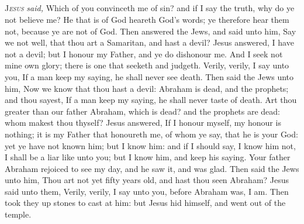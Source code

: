 \subsection{}
\lettrine{J}{\emph{esus}} \emph{said,} Which of you convinceth me of sin? and if I say the truth, why do ye not believe me? He that is of God heareth God's words; ye therefore hear them not, because ye are not of God. Then answered the Jews, and said unto him, Say we not well, that thou art a Samaritan, and hast a devil? Jesus answered, I have not a devil; but I honour my Father, and ye do dishonour me. And I seek not mine own glory; there is one that seeketh and judgeth. Verily, verily, I say unto you, If a man keep my saying, he shall never see death. Then said the Jews unto him, Now we know that thou hast a devil: Abraham is dead, and the prophets; and thou sayest, If a man keep my saying, he shall never taste of death. Art thou greater than our father Abraham, which is dead? and the prophets are dead: whom makest thou thyself? Jesus answered, If I honour myself, my honour is nothing; it is my Father that honoureth me, of whom ye say, that he is your God: yet ye have not known him; but I know him: and if I should say, I know him not, I shall be a liar like unto you; but I know him, and keep his saying. Your father Abraham rejoiced to see my day, and he saw it, and was glad. Then said the Jews unto him, Thou art not yet fifty years old, and hast thou seen Abraham? Jesus said unto them, Verily, verily, I say unto you, before Abraham was, I am. Then took they up stones to cast at him: but Jesus hid himself, and went out of the temple.


\subsection{}


